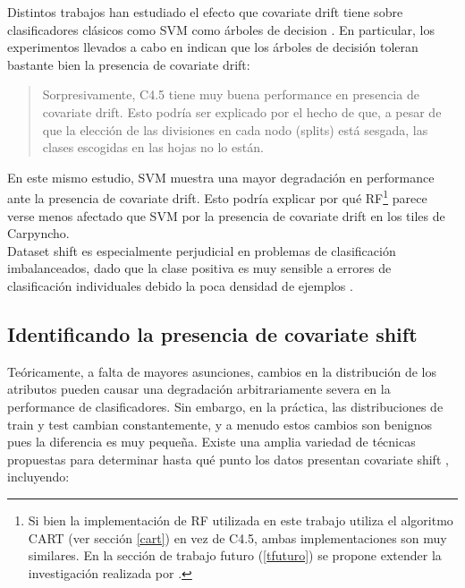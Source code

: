 Distintos trabajos han estudiado el efecto que covariate drift tiene sobre clasificadores clásicos como  SVM como árboles de decision \cite{non-stationary}. En particular, los experimentos llevados a cabo en \cite{selectionbias} indican que los árboles de decisión toleran bastante bien la presencia de covariate drift:

\begin{quotation}
Sorpresivamente, C4.5 tiene muy buena performance en presencia de covariate drift. Esto podría ser explicado por el hecho de que, a pesar de que la elección de las divisiones en cada nodo (splits) está sesgada, las clases escogidas en las hojas no lo están.
\end{quotation}

En este mismo estudio, SVM muestra una mayor degradación en performance ante la presencia de covariate drift. Esto podría explicar por qué RF\footnote{Si bien la implementación de RF utilizada en este trabajo utiliza el algoritmo CART (ver sección \protect\ref{cart}) en vez de C4.5, ambas implementaciones son muy similares. En la sección de trabajo futuro (\protect\ref{tfuturo}) se propone extender la investigación realizada por \protect\cite{selectionbias}.} parece verse menos afectado que SVM por la presencia de covariate drift en los tiles de Carpyncho. \\

Dataset shift es especialmente perjudicial en problemas de clasificación imbalanceados, dado que la clase positiva es muy sensible a errores de clasificación individuales debido la poca densidad de ejemplos \cite{LOPEZ20141}.

\subsection{Identificando la presencia de covariate shift}

Teóricamente, a falta de mayores asunciones, cambios en la distribución de los atributos pueden causar una degradación arbitrariamente severa en la performance de clasificadores. Sin embargo, en la práctica, las distribuciones de train y test cambian constantemente, y a menudo estos cambios son benignos pues la diferencia es muy pequeña. Existe una amplia variedad de técnicas propuestas para determinar hasta qué punto los datos presentan covariate shift \cite{rabanser2019failing} \cite{GeetaDharani2019CovariateSA}, incluyendo:

